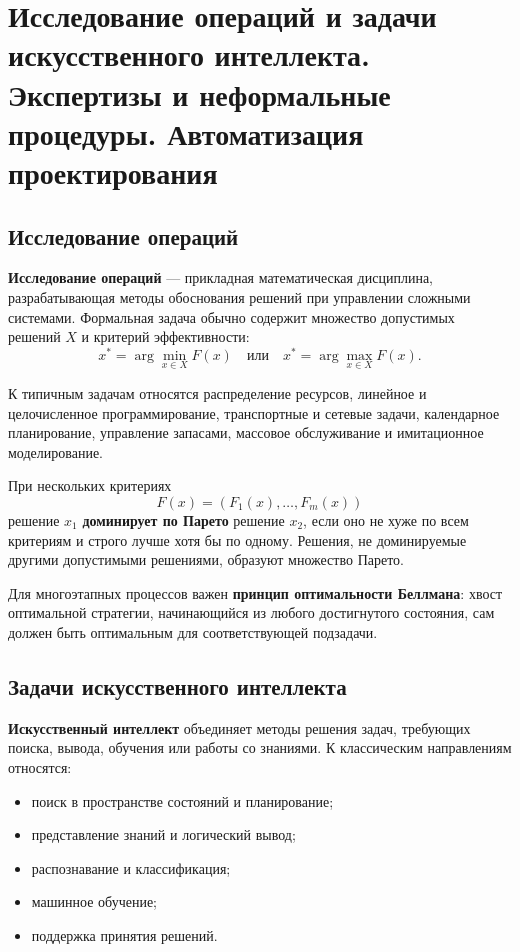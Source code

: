 \section{Исследование операций и задачи искусственного интеллекта. Экспертизы и неформальные процедуры. Автоматизация проектирования}

\subsection{Исследование операций}

\textbf{Исследование операций} --- прикладная математическая дисциплина, разрабатывающая методы обоснования решений при управлении сложными системами. Формальная задача обычно содержит множество допустимых решений $X$ и критерий эффективности:
\[
x^*=\arg\min_{x\in X}F(x)
\quad\text{или}\quad
x^*=\arg\max_{x\in X}F(x).
\]

К типичным задачам относятся распределение ресурсов, линейное и целочисленное программирование, транспортные и сетевые задачи, календарное планирование, управление запасами, массовое обслуживание и имитационное моделирование.

При нескольких критериях
\[
F(x)=(F_1(x),\ldots,F_m(x))
\]
решение $x_1$ \textbf{доминирует по Парето} решение $x_2$, если оно не хуже по всем критериям и строго лучше хотя бы по одному. Решения, не доминируемые другими допустимыми решениями, образуют множество Парето.

Для многоэтапных процессов важен \textbf{принцип оптимальности Беллмана}: хвост оптимальной стратегии, начинающийся из любого достигнутого состояния, сам должен быть оптимальным для соответствующей подзадачи.

\subsection{Задачи искусственного интеллекта}

\textbf{Искусственный интеллект} объединяет методы решения задач, требующих поиска, вывода, обучения или работы со знаниями. К классическим направлениям относятся:
\begin{itemize}
\item поиск в пространстве состояний и планирование;
\item представление знаний и логический вывод;
\item распознавание и классификация;
\item машинное обучение;
\item поддержка принятия решений.
\end{itemize}

